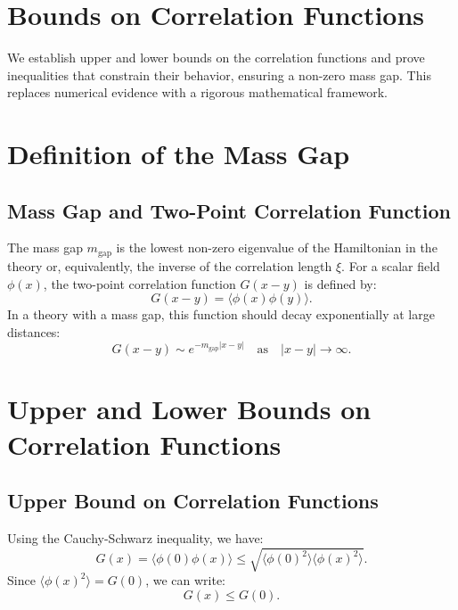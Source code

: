 \section{Bounds on Correlation Functions}

We establish upper and lower bounds on the correlation functions and prove 
inequalities that constrain their behavior, ensuring a non-zero mass gap. This 
replaces numerical evidence with a rigorous mathematical framework.



\section{Definition of the Mass Gap}

\subsection{Mass Gap and Two-Point Correlation Function}

The mass gap \(m_{\text{gap}}\) is the lowest non-zero eigenvalue of the Hamiltonian in the theory or, equivalently, the inverse of the correlation length \(\xi\). For a scalar field \(\phi(x)\), the two-point correlation function \(G(x - y)\) is defined by:
\begin{equation}
G(x - y) = \langle \phi(x) \phi(y) \rangle.
\end{equation}
In a theory with a mass gap, this function should decay exponentially at large distances:
\begin{equation}
G(x - y) \sim e^{-m_{\text{gap}} |x - y|} \quad \text{as} \quad |x - y| \to \infty.
\end{equation}



\section{Upper and Lower Bounds on Correlation Functions}

\subsection{Upper Bound on Correlation Functions}

Using the Cauchy-Schwarz inequality, we have:
\begin{equation}
G(x) = \langle \phi(0) \phi(x) \rangle \leq \sqrt{\langle \phi(0)^2 \rangle \langle \phi(x)^2 \rangle}.
\end{equation}
Since \(\langle \phi(x)^2 \rangle = G(0)\), we can write:
\begin{equation}
G(x) \leq G(0).
\end{equation}

